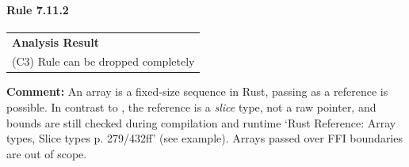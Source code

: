 \paragraph{Rule 7.11.2}
\begin{longtable}{p{13cm}}
\textbf{Analysis Result} \\
(C3) Rule can be dropped completely \\
\end{longtable}
\textbf{Comment:} An array is a fixed-size sequence in Rust, passing as a reference is possible. In contrast to \Cpp, the reference is a \textit{slice} type, not a raw pointer, and bounds are still checked during compilation and runtime `Rust Reference: Array types, Slice types p. 279/432ff' (see example). Arrays passed over FFI boundaries are out of scope. \\


